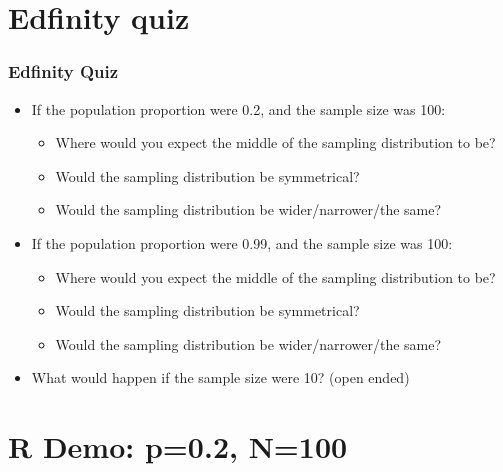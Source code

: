 \documentclass[t,compress,mathserif]{beamer}
\begin{document}


\section{Edfinity quiz}


\begin{frame}
    \frametitle{Edfinity Quiz}

    \begin{itemize}

        \item If the population proportion were 0.2, and the sample size was 100:
        \begin{itemize}
            \item Where would you expect the middle of the sampling distribution to be?
            \item Would the sampling distribution be symmetrical?
            \item Would the sampling distribution be wider/narrower/the same?
        \end{itemize}
        \item If the population proportion were 0.99, and the sample size was 100:
        \begin{itemize}
            \item Where would you expect the middle of the sampling distribution to be?
            \item Would the sampling distribution be symmetrical?
            \item Would the sampling distribution be wider/narrower/the same?
        \end{itemize}
        \item What would happen if the sample size were 10? (open ended)

    \end{itemize}

\end{frame}


\section{R Demo: p=0.2, N=100}

\end{document}

